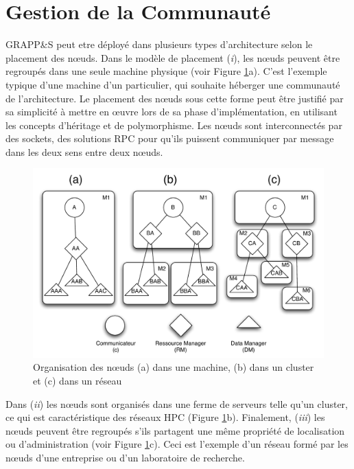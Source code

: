 \section{Gestion de la Communauté\label{SEC:Community}}

GRAPP\&S peut etre déployé dans plusieurs types d'architecture selon le placement des n{\oe}uds. Dans le modèle de placement (\textit{i}), les n{\oe}uds peuvent être regroupés dans une seule machine physique (voir Figure \ref{fig:noeuds}a). C'est l'exemple typique d'une machine d'un particulier, qui souhaite héberger une communauté de l'architecture. Le placement des n{\oe}uds sous cette forme peut être justifié par sa simplicité à mettre en {\oe}uvre lors de sa phase d'implémentation, en utilisant les concepts d'héritage et de polymorphisme. Les n{\oe}uds sont interconnectés par des sockets, des solutions RPC pour qu'ils puissent communiquer par message dans les deux sens entre deux n{\oe}uds. 

\begin{figure}
	\includegraphics[width=1\linewidth]{img/noeuds.pdf} 
	\caption{Organisation des n{\oe}uds (a) dans une machine, (b) dans un cluster et (c) dans un réseau\label{fig:noeuds}}
\end{figure}

Dans (\textit{ii}) les n{\oe}uds sont organisés dans une ferme de serveurs telle qu'un cluster, ce qui est caractéristique des réseaux HPC (Figure \ref{fig:noeuds}b). Finalement, (\textit{iii}) les n{\oe}uds peuvent être regroupés s'ils partagent une même propriété de localisation ou d'administration (voir Figure \ref{fig:noeuds}c). Ceci est l'exemple d'un réseau formé par les n{\oe}uds d'une entreprise ou d'un laboratoire de recherche. 

